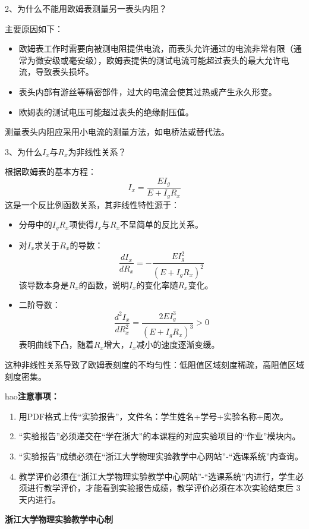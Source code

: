 \documentclass[10pt,a4paper]{ctexart}
\newcommand{\xiaosi}{\fontsize{12pt}{16pt}\selectfont}
\begin{document}
2、为什么不能用欧姆表测量另一表头内阻？

主要原因如下：
\begin{itemize}
    \item 欧姆表工作时需要向被测电阻提供电流，而表头允许通过的电流非常有限（通常为微安级或毫安级），欧姆表提供的测试电流可能超过表头的最大允许电流，导致表头损坏。
    \item 表头内部有游丝等精密部件，过大的电流会使其过热或产生永久形变。
    \item 欧姆表的测试电压可能超过表头的绝缘耐压值。
\end{itemize}
测量表头内阻应采用小电流的测量方法，如电桥法或替代法。

3、为什么$I_x$与$R_x$为非线性关系？

根据欧姆表的基本方程：
\[
I_x = \frac{E I_g}{E + I_g R_x}
\]
这是一个反比例函数关系，其非线性特性源于：
\begin{itemize}
    \item 分母中的$I_g R_x$项使得$I_x$与$R_x$不呈简单的反比关系。
    \item 对$I_x$求关于$R_x$的导数：
    \[
    \frac{dI_x}{dR_x} = -\frac{E I_g^2}{(E + I_g R_x)^2}
    \]
    该导数本身是$R_x$的函数，说明$I_x$的变化率随$R_x$变化。
    \item 二阶导数：
    \[
    \frac{d^2I_x}{dR_x^2} = \frac{2E I_g^3}{(E + I_g R_x)^3} > 0
    \]
    表明曲线下凸，随着$R_x$增大，$I_x$减小的速度逐渐变缓。
\end{itemize}
这种非线性关系导致了欧姆表刻度的不均匀性：低阻值区域刻度稀疏，高阻值区域刻度密集。

\newpage

hao\textbf{注意事项：}
\xiaosi
\begin{enumerate}
    \item 用PDF格式上传“实验报告”，文件名：学生姓名+学号+实验名称+周次。
    \item  “实验报告”必须递交在“学在浙大”的本课程的对应实验项目的“作业”模块内。
    \item  “实验报告”成绩必须在“浙江大学物理实验教学中心网站”-“选课系统”内查询。
    \item 教学评价必须在“浙江大学物理实验教学中心网站”-“选课系统”内进行，学生必须进行教学评价，才能看到实验报告成绩，教学评价必须在本次实验结束后 3 天内进行。
\end{enumerate}

\vspace{1cm}
\xiaosi\centering \textbf{浙江大学物理实验教学中心制}
\end{document}
